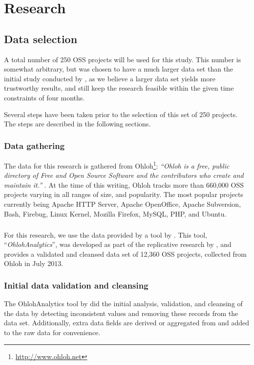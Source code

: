 \chapter{Research}
\label{research}

\section{Data selection}
\label{method:data}
A total number of 250 OSS projects will be used for this study. This number is
somewhat arbitrary, but was chosen to have a much larger data set than the
initial study conducted by \citet{karus2013}, as we believe a larger data
set yields more trustworthy results, and still keep the research feasible
within the given time constraints of four months.

Several steps have been taken prior to the selection of this set of 250
projects. The steps are described in the following sections.

\subsection{Data gathering}
The data for this research is gathered from
Ohloh\footnote{\url{http://www.ohloh.net}}: \emph{``Ohloh is a free, public
directory of Free and Open Source Software and the contributors who create and
maintain it.'' }\rm \cite{ohloh}. At the time of this writing, Ohloh tracks more
than 660,000 OSS projects varying in all ranges of size, and popularity. The
most popular projects currently being Apache HTTP Server, Apache OpenOffice,
Apache Subversion, Bash, Firebug, Linux Kernel, Mozilla Firefox, MySQL, PHP,
and Ubuntu.

\paragraph{}
For this research, we use the data provided by a tool by \citet{ohlohanalytics}.
This tool, ``\emph{OhlohAnalytics}\rm'', was developed as part of the
replicative research by \citet{bruntink2014}, and provides a validated and
cleansed data set of 12,360 OSS projects, collected from Ohloh in July 2013.

\subsection{Initial data validation and cleansing}
The OhlohAnalytics tool by \citet{ohlohanalytics} did the initial analysis,
validation, and cleansing of the data by detecting inconsistent values and
removing these records from the data set. Additionally, extra data fields are
derived or aggregated from and added to the raw data for convenience.

